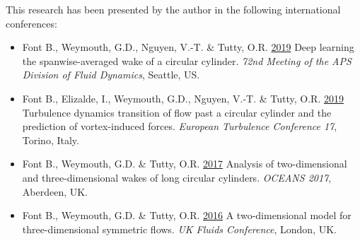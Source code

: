 \documentclass[../main.tex]{subfiles}
\begin{document}
This research has been presented by the author in the following international conferences:

\begin{itemize}
	\item Font B., Weymouth, G.D., Nguyen, V.-T. \& Tutty, O.R. \href{https://meetings.aps.org/Meeting/DFD19/Session/L17.5}{2019} Deep learning the spanwise-averaged wake of a circular cylinder. \textit{72nd Meeting of the APS Division of Fluid Dynamics}, Seattle, US.

	\item Font B., Elizalde, I., Weymouth, G.D., Nguyen, V.-T. \& Tutty, O.R. \href{https://etc17.fyper.com/program/show_slot/41}{2019} Turbulence dynamics transition of flow past a circular cylinder and the prediction of vortex-induced forces. \textit{European Turbulence Conference 17}, Torino, Italy.

	\item Font B., Weymouth, G.D. \& Tutty, O.R. \href{https://doi.org/10.1109/OCEANSE.2017.8084904}{2017} Analysis of two-dimensional and three-dimensional wakes of long circular cylinders. \textit{OCEANS 2017}, Aberdeen, UK.

	\item Font B., Weymouth, G.D. \& Tutty, O.R. \href{https://www.imperial.ac.uk/media/imperial-college/faculty-of-engineering/aeronautics/UK-Fluids-Conference-2016-booklet.pdf}{2016} A two-dimensional model for three-dimensional symmetric flows. \textit{UK Fluids Conference}, London, UK.
\end{itemize}
\end{document}
